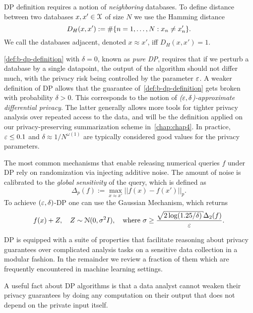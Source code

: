 DP definition requires a notion of \emph{neighboring} databases.
To define distance between two databases $x, x' \in \mathcal{X}$ of size $ N $ we use the Hamming distance
\[
D_{H}(x, x') := \#\{n=1,\ldots,N: x_n \neq x'_n \}.
\]
We call the databases adjacent, denoted $ x \approx x'$, iff $D_{H}(x, x')=1$.


\label{sec:b-differential-privacy}

\cref{def:b-dp-definition} with $\delta=0$, known as \emph{pure DP}, requires that if we perturb a database by a single datapoint, the output of the algorithm should not differ much, with the privacy risk being controlled by the parameter $\varepsilon$.
A weaker definition of DP allows that the guarantee of~\cref{def:b-dp-definition} gets broken with probability $\delta>0$. This corresponds to the notion of \emph{($\varepsilon, \delta$)-approximate differential privacy}. The latter generally allows more tools for tighter privacy analysis over repeated access to the data, and will be the definition applied on our privacy-preserving summarization scheme in~\cref{chap:chap4}. In practice, $\varepsilon \leq 0.1$ and $\delta \approx 1/N^{\omega(1)}$ are typically considered good values for the privacy parameters. 

The most common mechanisms that enable releasing numerical queries $f$ under DP rely on randomization via injecting additive noise. The amount of noise is calibrated to the \emph{global sensitivity} of the query, which is defined as 
\[
\Delta_p(f) := \underset{x \approx x'}{\max} ||f(x)-f(x')||_p.
\]
To achieve $(\varepsilon, \delta)$-DP one can use the Gaussian Mechanism, which returns
\[
f(x)+Z, \quad Z \sim \mcN(0, \sigma^2 I), \quad \text{where } \sigma \geq \frac{\sqrt{2\log(1.25/\delta)}\Delta_2(f)}{\veps}.
\]

DP is equipped with a suite of properties that facilitate reasoning about privacy guarantees over complicated analysis tasks on a sensitive data collection in a modular fashion. In the remainder we review a fraction of them which are frequently encountered in machine learning settings.

A useful fact about DP algorithms is that a data analyst cannot weaken their privacy guarantees by doing any computation on their output that does not depend on the private input itself.

